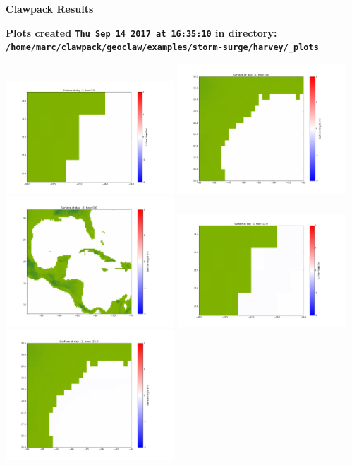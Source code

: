 \documentclass[11pt]{article}
\begin{document}
        \begin{center}{\Large\bf Clawpack Results}\vskip 5pt
        
        \bf Plots created {\tt Thu Sep 14 2017 at 16:35:10} in directory: \vskip 5pt
        \verb+/home/marc/clawpack/geoclaw/examples/storm-surge/harvey/_plots+
        \end{center}
        \vskip 5pt
        \includegraphics[width=0.475\textwidth]{frame0000fig1001.png}
\includegraphics[width=0.475\textwidth]{frame0000fig1002.png}
\vskip 10pt 
\includegraphics[width=0.475\textwidth]{frame0000fig1003.png}
\vskip 10pt 
\includegraphics[width=0.475\textwidth]{frame0001fig1001.png}
\includegraphics[width=0.475\textwidth]{frame0001fig1002.png}
\end{document}
